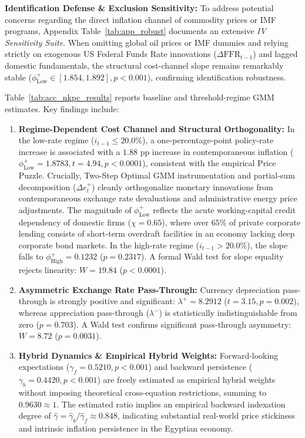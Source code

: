 \documentclass[review,12pt]{elsarticle}
\begin{document}
\textbf{Identification Defense & Exclusion Sensitivity:} To address potential concerns regarding the direct inflation channel of commodity prices or IMF programs, Appendix Table~\ref{tab:app_robust} documents an extensive \textit{IV Sensitivity Suite}. When omitting global oil prices or IMF dummies and relying strictly on exogenous US Federal Funds Rate innovations ($\Delta\text{FFR}_{t-1}$) and lagged domestic fundamentals, the structural cost-channel slope remains remarkably stable ($\phi_{\text{Low}}^+ \in [1.854, 1.892], p < 0.001$), confirming identification robustness.

Table~\ref{tab:acc_nkpc_results} reports baseline and threshold-regime GMM estimates.
Key findings include:
\begin{enumerate}[label=\textbf{(\arabic*)}]
\item \textbf{Regime-Dependent Cost Channel and Structural Orthogonality:} In the low-rate regime ($i_{t-1} \le 20.0\%$),
a one-percentage-point policy-rate increase is associated with a $1.88$ pp increase in
contemporaneous inflation ($\phi_{\text{Low}}^{+} = 1.8783, t = 4.94, p < 0.0001$), consistent
with the empirical Price Puzzle. Crucially, Two-Step Optimal GMM instrumentation and partial-sum decomposition ($\Delta e_t^+$) cleanly orthogonalize monetary innovations from contemporaneous exchange rate devaluations and administrative energy price adjustments. The magnitude of $\phi_{\text{Low}}^+$ reflects the acute working-capital credit dependency of domestic firms ($\chi = 0.65$), where over $65\%$ of private corporate lending consists of short-term overdraft facilities in an economy lacking deep corporate bond markets. In the high-rate regime ($i_{t-1} > 20.0\%$), the slope falls
to $\phi_{\text{High}}^{+} = 0.1232$ ($p = 0.2317$). A formal Wald test for slope equality
rejects linearity: $W = 19.84$ ($p < 0.0001$).
\item \textbf{Asymmetric Exchange Rate Pass-Through:} Currency depreciation pass-through is
strongly positive and significant: $\lambda^{+} = 8.2912$ ($t = 3.15, p = 0.002$), whereas
appreciation pass-through ($\lambda^{-}$) is statistically indistinguishable from zero ($p = 0.703$).
A Wald test confirms significant pass-through asymmetry: $W = 8.72$ ($p = 0.0031$).
\item \textbf{Hybrid Dynamics & Empirical Hybrid Weights:} Forward-looking expectations ($\gamma_f = 0.5210, p < 0.001$) and backward persistence ($\gamma_b = 0.4420, p < 0.001$) are freely estimated as empirical hybrid weights without imposing theoretical cross-equation restrictions, summing to $0.9630 \approx 1$. The estimated ratio implies an empirical backward indexation degree of $\hat{\gamma} = \hat{\gamma}_b / \hat{\gamma}_f \approx 0.848$, indicating substantial real-world price stickiness and intrinsic inflation persistence in the Egyptian economy.
\end{enumerate}
\end{document}
